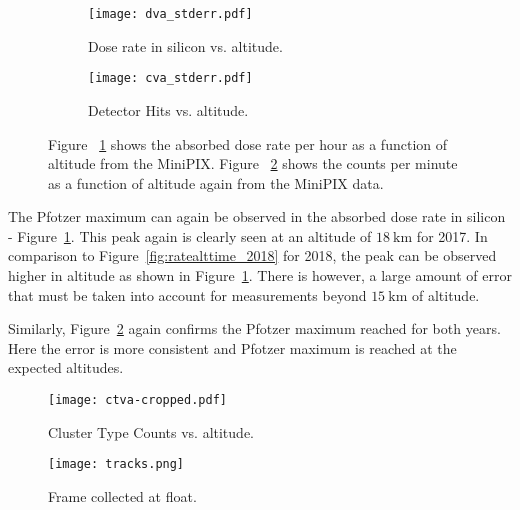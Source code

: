%
%
%
\begin{figure}[H]
\centering
\begin{subfigure}{.5\textwidth}
  \centering
  \texttt{[image: dva\_stderr.pdf]}
  \caption{Dose rate in silicon vs. altitude.}
  \label{fig:sub1}
\end{subfigure}%
\begin{subfigure}{.5\textwidth}
  \centering
  \texttt{[image: cva\_stderr.pdf]}
  \caption{Detector Hits vs. altitude.}
  \label{fig:sub2}
\end{subfigure}
\caption{Figure ~\ref{fig:sub1} shows the absorbed dose rate per hour as a function of altitude from the MiniPIX.  Figure ~\ref{fig:sub2} shows the counts per minute as a function of altitude again from the MiniPIX data.}
\label{fig:test}
\end{figure}
The Pfotzer maximum can again be observed in the absorbed dose rate in silicon - Figure~\ref{fig:sub1}.  This peak again is clearly seen at an altitude of $\SI{18}{\kilo\meter}$ for 2017.  In comparison to Figure~\ref{fig:ratealttime_2018} for 2018, the peak can be observed higher in altitude as shown in Figure~\ref{fig:sub1}.  There is however, a large amount of error that must be taken into account for measurements beyond $\SI{15}{\kilo\meter}$ of altitude. 

Similarly, Figure~\ref{fig:sub2} again confirms the Pfotzer maximum reached for both years.  Here the error is more consistent and Pfotzer maximum is reached at the expected altitudes.

\begin{figure}[H]
\centering
\texttt{[image: ctva-cropped.pdf]}
\caption{Cluster Type Counts vs. altitude.}
\end{figure}

\begin{figure}[H]
\centering
\texttt{[image: tracks.png]}
\caption{Frame collected at float.}
\end{figure}

